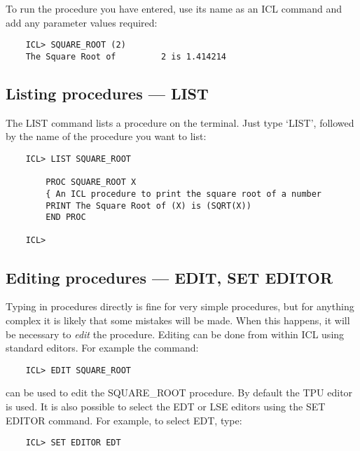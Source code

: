 To run the procedure you have entered, use its name as an ICL command and add
any parameter values required:

\begin{small}
\begin{verbatim}
    ICL> SQUARE_ROOT (2)
    The Square Root of         2 is 1.414214
\end{verbatim}
\end{small}

\subsection{Listing procedures --- LIST}

The LIST command lists a procedure on the terminal.
Just type `LIST', followed by the name of the procedure you want to list:

\begin{small}
\begin{verbatim}
    ICL> LIST SQUARE_ROOT

        PROC SQUARE_ROOT X
        { An ICL procedure to print the square root of a number
        PRINT The Square Root of (X) is (SQRT(X))
        END PROC

    ICL>
\end{verbatim}
\end{small}

\subsection{Editing procedures --- EDIT, SET EDITOR}

Typing in procedures directly is fine for very simple procedures, but for
anything complex it is likely that some mistakes will be made.
When this happens, it will be necessary to {\em edit} the procedure.
Editing can be done from within ICL using standard editors.
For example the command:

\begin{small}
\begin{verbatim}
    ICL> EDIT SQUARE_ROOT
\end{verbatim}
\end{small}

can be used to edit the SQUARE\_ROOT procedure.
By default the TPU editor is used.
It is also possible to select the EDT or LSE editors using the SET EDITOR
command.
For example, to select EDT, type:

\begin{small}
\begin{verbatim}
    ICL> SET EDITOR EDT
\end{verbatim}
\end{small}

